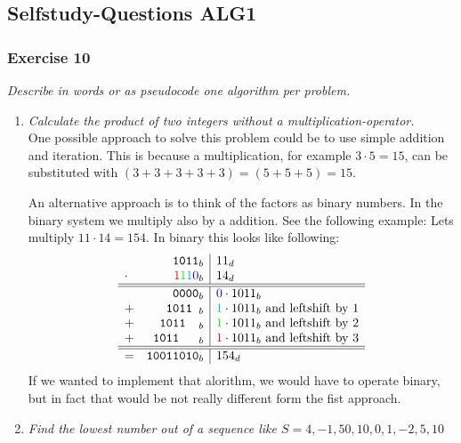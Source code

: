 \newpage
\subsection{Selfstudy-Questions ALG1}

\subsubsection*{Exercise 10}
\textit{Describe in words or as pseudocode one algorithm per problem.}\\

\begin{enumerate}[label={(\alph*)}]
	\item \textit{Calculate the product of two integers without a 
		multiplication-operator.}\\

		One possible approach to solve this problem could be to
		use simple addition and iteration. This is because a 
		multiplication, for example $3 \cdot 5 = 15$, can be
		substituted with $(3 + 3 + 3 + 3 + 3) = (5 + 5 + 5) = 15$.
		
		

		An alternative approach is to think of the factors as binary
		numbers. In the binary system we multiply also by a addition.
		See the following example: Lets multiply $11 \cdot 14 = 154$.
		In binary this looks like following:
		\[ \begin{array}{l r | l}
			& \texttt{1011}_b & 11_d \\
			\cdot & \textcolor{red}{1}
				\textcolor{green}{1}
				\textcolor{cyan}{1}
				\textcolor{blue}{0}_b & 14_d \\
			\hline \hline 
			& \texttt{0000}_b & \textcolor{blue}{0} \cdot 1011_b \\
			+ & \texttt{1011~}_b & \textcolor{cyan}{1} \cdot 1011_b \text{ and leftshift by 1} \\
			+ & \texttt{1011~~}_b & \textcolor{green}{1} \cdot 1011_b \text{ and leftshift by 2}\\
			+ & \texttt{1011~~~}_b & \textcolor{red}{1} \cdot 1011_b \text{ and leftshift by 3} \\
			\hline \hline
			= & \texttt{10011010}_b & 154_d
		\end{array} \]
		If we wanted to implement that alorithm, we would have to 
		operate binary, but in fact that would be not really 
		different form the fist approach.
	\item \textit{Find the lowest number out of a sequence like 
		$S = {4,-1,50,10,0,1,-2,5,10}$}\\
		
		
\end{enumerate}

